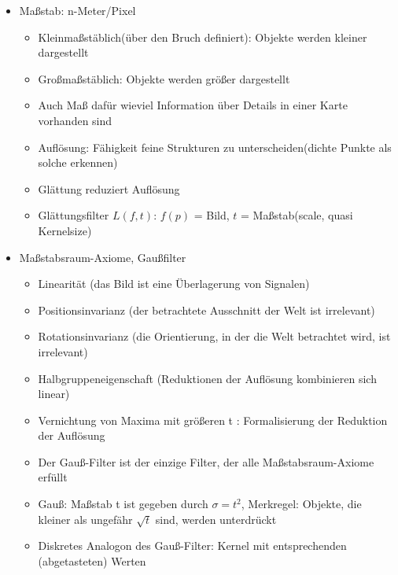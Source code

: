 \documentclass[11pt]{article}
\begin{document}
\begin{itemize}
    \item Maßstab: n-Meter/Pixel
        \begin{itemize}
            \item Kleinmaßstäblich(über den Bruch definiert): Objekte werden kleiner dargestellt
            \item Großmaßstäblich: Objekte werden größer dargestellt
            \item Auch Maß dafür wieviel Information über Details in einer Karte vorhanden sind
            \item Auflösung: Fähigkeit feine Strukturen zu unterscheiden(dichte Punkte als solche erkennen)
            \item Glättung reduziert Auflösung
            \item Glättungsfilter $L(f,t)$: $f(p)$ = Bild, $t$ = Maßstab(scale, quasi Kernelsize)
        \end{itemize}
    \item Maßstabsraum-Axiome, Gaußfilter
    \begin{itemize}
        \item Linearität (das Bild ist eine Überlagerung von Signalen)
        \item Positionsinvarianz (der betrachtete Ausschnitt der Welt ist irrelevant)
        \item Rotationsinvarianz (die Orientierung, in der die Welt betrachtet wird, ist irrelevant)
        \item Halbgruppeneigenschaft (Reduktionen der Auflösung kombinieren sich linear)
        \item Vernichtung von Maxima mit größeren t : Formalisierung der Reduktion der Auflösung
        \item Der Gauß-Filter ist der einzige Filter, der alle Maßstabsraum-Axiome erfüllt
        \item Gauß: Maßstab t ist gegeben durch $\sigma = t^2$, Merkregel: Objekte, die kleiner als ungefähr $\sqrt{t}$ sind, werden unterdrückt
        \item Diskretes Analogon des Gauß-Filter: Kernel mit entsprechenden (abgetasteten) Werten
    \end{itemize}
\end{itemize}
\end{document}
